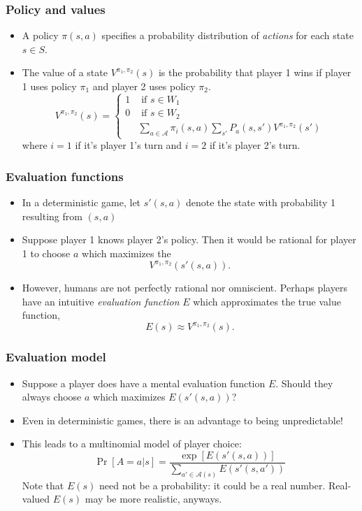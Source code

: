 \documentclass{beamer}
\begin{document}
\begin{frame}
\frametitle{Policy and values}
\begin{itemize}
\item A policy $\pi(s, a)$ specifies a probability distribution of \emph{actions} for each state $s \in S$.
\item The value of a state $V^{\pi_1,\pi_2}(s)$ is the probability that player 1 wins if player 1 uses policy $\pi_1$
and player 2 uses policy $\pi_2$.
\[
V^{\pi_1,\pi_2}(s) = \begin{cases}
1 &\text{ if }s\in W_1\\
0 &\text{ if }s \in W_2\\
& \sum_{a \in \mathcal{A}} \pi_i(s, a) \sum_{s'} P_a(s, s') V^{\pi_1,\pi_2}(s')
\end{cases}
\]
where $i=1$ if it's player 1's turn and $i=2$ if it's player 2's turn.
\end{itemize}
\end{frame}

\begin{frame}
\frametitle{Evaluation functions}
\begin{itemize}
\item In a deterministic game, let $s'(s, a)$ denote the state with probability 1 resulting from $(s, a)$
\item Suppose player 1 knows player 2's policy.  Then it would be rational for player 1 to choose $a$ which maximizes the 
\[
V^{\pi_1,\pi_2}(s'(s, a)).
\]
\item However, humans are not perfectly rational nor omniscient.  Perhaps players have an intuitive \emph{evaluation function} $E$ which approximates the true value function,
\[
E(s) \approx V^{\pi_1,\pi_2}(s).
\]
\end{itemize}
\end{frame}

\begin{frame}
\frametitle{Evaluation model}
\begin{itemize}
\item Suppose a player does have a mental evaluation function $E$.  Should they always choose $a$ which maximizes $E(s'(s, a))$?
\item Even in deterministic games, there is an advantage to being unpredictable!
\item This leads to a multinomial model of player choice:
\[
\Pr[A = a|s] = \frac{\exp[E(s'(s, a))]}{\sum_{a' \in \mathcal{A}(s)} E(s'(s, a'))}
\]
Note that $E(s)$ need not be a probability: it could be a real number.
Real-valued $E(s)$ may be more realistic, anyways.
\end{itemize}
\end{frame}
\end{document}
